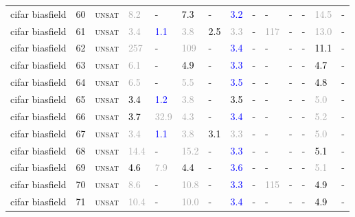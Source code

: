 \begin{center}
{\begin{longtable}{@{}llllllllllllll@{}}
cifar biasfield & 60 & \textsc{unsat} & \textcolor{darkgray}{8.2} & - & \textcolor{black}{7.3} & - & \textcolor{blue}{3.2} & - & - & - & - & \textcolor{darkgray}{14.5} & - \\
cifar biasfield & 61 & \textsc{unsat} & \textcolor{darkgray}{3.4} & \textcolor{blue}{1.1} & \textcolor{darkgray}{3.8} & \textcolor{black}{2.5} & \textcolor{darkgray}{3.3} & - & \textcolor{darkgray}{117} & - & - & \textcolor{darkgray}{13.0} & - \\
cifar biasfield & 62 & \textsc{unsat} & \textcolor{darkgray}{257} & - & \textcolor{darkgray}{109} & - & \textcolor{blue}{3.4} & - & - & - & - & \textcolor{black}{11.1} & - \\
cifar biasfield & 63 & \textsc{unsat} & \textcolor{darkgray}{6.1} & - & \textcolor{black}{4.9} & - & \textcolor{blue}{3.3} & - & - & - & - & \textcolor{black}{4.7} & - \\
cifar biasfield & 64 & \textsc{unsat} & \textcolor{darkgray}{6.5} & - & \textcolor{darkgray}{5.5} & - & \textcolor{blue}{3.5} & - & - & - & - & \textcolor{black}{4.8} & - \\
cifar biasfield & 65 & \textsc{unsat} & \textcolor{black}{3.4} & \textcolor{blue}{1.2} & \textcolor{darkgray}{3.8} & - & \textcolor{black}{3.5} & - & - & - & - & \textcolor{darkgray}{5.0} & - \\
cifar biasfield & 66 & \textsc{unsat} & \textcolor{black}{3.7} & \textcolor{darkgray}{32.9} & \textcolor{darkgray}{4.3} & - & \textcolor{blue}{3.4} & - & - & - & - & \textcolor{darkgray}{5.2} & - \\
cifar biasfield & 67 & \textsc{unsat} & \textcolor{darkgray}{3.4} & \textcolor{blue}{1.1} & \textcolor{darkgray}{3.8} & \textcolor{black}{3.1} & \textcolor{darkgray}{3.3} & - & - & - & - & \textcolor{darkgray}{5.0} & - \\
cifar biasfield & 68 & \textsc{unsat} & \textcolor{darkgray}{14.4} & - & \textcolor{darkgray}{15.2} & - & \textcolor{blue}{3.3} & - & - & - & - & \textcolor{black}{5.1} & - \\
cifar biasfield & 69 & \textsc{unsat} & \textcolor{black}{4.6} & \textcolor{darkgray}{7.9} & \textcolor{black}{4.4} & - & \textcolor{blue}{3.6} & - & - & - & - & \textcolor{darkgray}{5.1} & - \\
cifar biasfield & 70 & \textsc{unsat} & \textcolor{darkgray}{8.6} & - & \textcolor{darkgray}{10.8} & - & \textcolor{blue}{3.3} & - & \textcolor{darkgray}{115} & - & - & \textcolor{black}{4.9} & - \\
cifar biasfield & 71 & \textsc{unsat} & \textcolor{darkgray}{10.4} & - & \textcolor{darkgray}{10.0} & - & \textcolor{blue}{3.4} & - & - & - & - & \textcolor{black}{4.9} & - \\

\end{longtable}}
\end{center}
